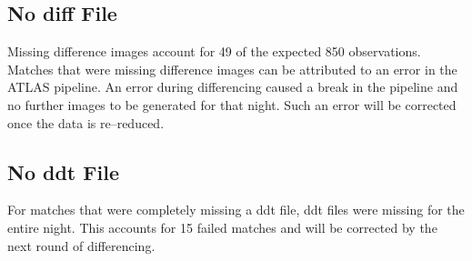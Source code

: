 \subsection{No diff File}
\indent Missing difference images account for 49 of the expected 850 observations. 
Matches that were missing difference images can be attributed to an error in the 
ATLAS pipeline. An error during differencing caused a break in the pipeline and no 
further images to be generated for that night. Such an error will be corrected once 
the data is re--reduced.


\subsection{No ddt File}
\indent For matches that were completely missing a ddt file, ddt files were missing 
for the entire night. This accounts for 15 failed matches and will be corrected by 
the next round of differencing.

